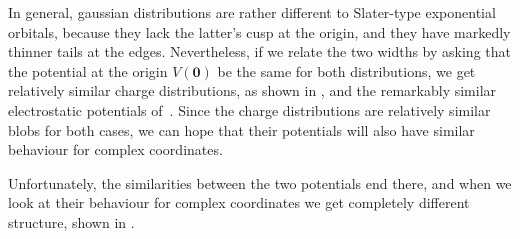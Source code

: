 In general, gaussian distributions are rather different to Slater-type exponential orbitals, because they lack the latter's cusp at the origin, and they have markedly thinner tails at the edges. Nevertheless, if we relate the two widths by asking that the potential at the origin $V(\mathbf 0)$ be the same for both distributions, we get relatively similar charge distributions, as shown in , and the remarkably similar electrostatic potentials of~. Since the charge distributions are relatively similar blobs for both cases, we can hope that their potentials will also have similar behaviour for complex coordinates.






Unfortunately, the similarities between the two potentials end there, and when we look at their behaviour for complex coordinates we get completely different structure, shown in .



